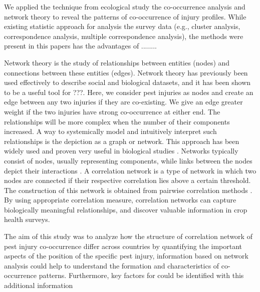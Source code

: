 We applied the technique from ecological study the co-occurrence analysis and network theory to reveal the patterns of co-occurrence of injury profiles. While existing statistic approach for analysis the survey data (e.g., cluster analysis, correspondence analysis, multiple correspondence analysis), the methods were present in this papers has the advantages of ........

Network theory is the study of relationships between entities (nodes) and connections between these entities (edges). Network theory has previously been used effectively to describe social and biological datasets, and it has been shown to be a useful tool for ???. Here, we consider pest injuries as nodes and create an edge between any two injuries if they are co-existing. We give an edge greater weight if the two injuries have strong co-occurrence at either end.  The relationships will be more complex when the number of their components increased. A way to systemically model and intuitively interpret such relationships is the depiction as a graph or network. This approach has been widely used and proven very useful in biological studies \cite{Moslonka_Lefebvre_2011}. Networks typically consist of nodes, usually representing components, while links between the nodes depict their interactions \cite{Proulx_2005}. A correlation network is a type of network in which two nodes are connected if their respective correlation lies above a certain threshold. The construction of this network is obtained from pairwise correlation methods \cite{Toubiana_2013}. By using appropriate correlation measure, correlation networks can capture biologically meaningful relationships, and discover valuable information in crop health surveys.

The aim of this study was to analyze how the structure of correlation network of pest injury co-occurrence differ across countries by quantifying the important aspects of the position of the specific pest injury, information based on network analysis could help to understand the formation and characteristics of co-occurrence patterns. Furthermore, key factors for could be identified with this additional information